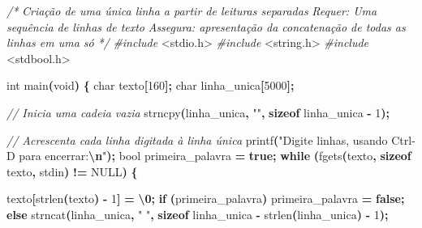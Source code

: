 \documentclass[
  11pt,
  a4paper,
]{scrbook}
\newenvironment{Shaded}{\begin{snugshade}}{\end{snugshade}}
\newcommand{\CharTok}[1]{\textcolor[rgb]{0.31,0.60,0.02}{#1}}
\newcommand{\CommentTok}[1]{\textcolor[rgb]{0.56,0.35,0.01}{\textit{#1}}}
\newcommand{\ControlFlowTok}[1]{\textcolor[rgb]{0.13,0.29,0.53}{\textbf{#1}}}
\newcommand{\DataTypeTok}[1]{\textcolor[rgb]{0.13,0.29,0.53}{#1}}
\newcommand{\DecValTok}[1]{\textcolor[rgb]{0.00,0.00,0.81}{#1}}
\newcommand{\ImportTok}[1]{#1}
\newcommand{\KeywordTok}[1]{\textcolor[rgb]{0.13,0.29,0.53}{\textbf{#1}}}
\newcommand{\NormalTok}[1]{#1}
\newcommand{\OperatorTok}[1]{\textcolor[rgb]{0.81,0.36,0.00}{\textbf{#1}}}
\newcommand{\PreprocessorTok}[1]{\textcolor[rgb]{0.56,0.35,0.01}{\textit{#1}}}
\newcommand{\SpecialCharTok}[1]{\textcolor[rgb]{0.81,0.36,0.00}{\textbf{#1}}}
\newcommand{\StringTok}[1]{\textcolor[rgb]{0.31,0.60,0.02}{#1}}
\begin{document}
\begin{Shaded}
\begin{Highlighting}[]
\CommentTok{/*}
\CommentTok{Criação de uma única linha a partir de leituras separadas}
\CommentTok{Requer: Uma sequência de linhas de texto}
\CommentTok{Assegura: apresentação da concatenação de todas as linhas em uma só}
\CommentTok{*/}
\PreprocessorTok{\#include }\ImportTok{\textless{}stdio.h\textgreater{}}
\PreprocessorTok{\#include }\ImportTok{\textless{}string.h\textgreater{}}
\PreprocessorTok{\#include }\ImportTok{\textless{}stdbool.h\textgreater{}}

\DataTypeTok{int}\NormalTok{ main}\OperatorTok{(}\DataTypeTok{void}\OperatorTok{)} \OperatorTok{\{}
    \DataTypeTok{char}\NormalTok{ texto}\OperatorTok{[}\DecValTok{160}\OperatorTok{];}
    \DataTypeTok{char}\NormalTok{ linha\_unica}\OperatorTok{[}\DecValTok{5000}\OperatorTok{];}

    \CommentTok{// Inicia uma cadeia vazia}
\NormalTok{    strncpy}\OperatorTok{(}\NormalTok{linha\_unica}\OperatorTok{,} \StringTok{""}\OperatorTok{,} \KeywordTok{sizeof}\NormalTok{ linha\_unica }\OperatorTok{{-}} \DecValTok{1}\OperatorTok{);}

    \CommentTok{// Acrescenta cada linha digitada à linha única}
\NormalTok{    printf}\OperatorTok{(}\StringTok{"Digite linhas, usando Ctrl{-}D para encerrar:}\SpecialCharTok{\textbackslash{}n}\StringTok{"}\OperatorTok{);}
    \DataTypeTok{bool}\NormalTok{ primeira\_palavra }\OperatorTok{=} \KeywordTok{true}\OperatorTok{;}
    \ControlFlowTok{while} \OperatorTok{(}\NormalTok{fgets}\OperatorTok{(}\NormalTok{texto}\OperatorTok{,} \KeywordTok{sizeof}\NormalTok{ texto}\OperatorTok{,}\NormalTok{ stdin}\OperatorTok{)} \OperatorTok{!=}\NormalTok{ NULL}\OperatorTok{)} \OperatorTok{\{}

\NormalTok{        texto}\OperatorTok{[}\NormalTok{strlen}\OperatorTok{(}\NormalTok{texto}\OperatorTok{)} \OperatorTok{{-}} \DecValTok{1}\OperatorTok{]} \OperatorTok{=} \CharTok{\textquotesingle{}}\SpecialCharTok{\textbackslash{}0}\CharTok{\textquotesingle{}}\OperatorTok{;}
        \ControlFlowTok{if} \OperatorTok{(}\NormalTok{primeira\_palavra}\OperatorTok{)}
\NormalTok{            primeira\_palavra }\OperatorTok{=} \KeywordTok{false}\OperatorTok{;}
        \ControlFlowTok{else}
\NormalTok{            strncat}\OperatorTok{(}\NormalTok{linha\_unica}\OperatorTok{,} \StringTok{" "}\OperatorTok{,}
                    \KeywordTok{sizeof}\NormalTok{ linha\_unica }\OperatorTok{{-}}\NormalTok{ strlen}\OperatorTok{(}\NormalTok{linha\_unica}\OperatorTok{)} \OperatorTok{{-}} \DecValTok{1}\OperatorTok{);}


\end{Highlighting}
\end{Shaded}
\end{document}
